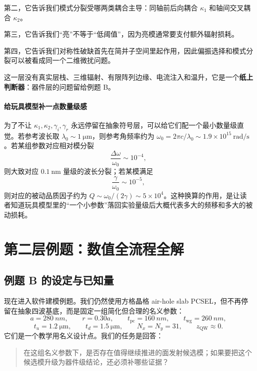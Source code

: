 第二，它告诉我们模式分裂受哪两类耦合主导：同轴前后向耦合 $\kappa_1$ 和轴间交叉耦合 $\kappa_2$。

第三，它告诉我们“亮”不等于“低阈值”，因为亮模通常要支付额外辐射损耗。

第四，它告诉我们对称性破缺首先在简并子空间里起作用，因此偏振选择和模式分裂可以被看成同一个二维微扰问题。

这一层没有真实层栈、三维辐射、有限阵列边缘、电流注入和温升，它是一个\textbf{纸上判断器}：器件层的问题留给例题 B。

\paragraph{给玩具模型补一点数量级感}
为了不让 $\kappa_1,\kappa_2,\gamma_i,\gamma_r$ 永远停留在抽象符号层，可以给它们配一个最小数量级直觉。若参考波长取 $\lambda_0\sim\SI{1}{\micro\meter}$，则参考角频率约为 $\omega_0=2\pi c/\lambda_0\sim 1.9\times10^{15}\ \mathrm{rad/s}$。若某组参数对应相对模分裂
\[
\frac{\Delta\omega}{\omega_0}\sim 10^{-4},
\]
则大致对应 $0.1\ \mathrm{nm}$ 量级的波长分裂；若某模满足
\[
\frac{\gamma}{\omega_0}\sim 10^{-5},
\]
则对应的被动品质因子约为 $Q\sim \omega_0/(2\gamma)\sim 5\times10^4$。这种换算的作用，是让读者知道玩具模型里的“一个小参数”落回实验量级后大概代表多大的频移和多大的被动损耗。

\section{第二层例题：数值全流程全解}
\subsection{例题 B 的设定与已知量}
现在进入软件建模例题。我们仍然使用方格晶格 air-hole slab PCSEL，但不再停留在抽象四波基底，而是固定一组简化但合理的名义参数：
\begin{equation}
a=\SI{280}{nm},
\qquad
r=0.30a,
\qquad
t_{\mathrm{pc}}=\SI{160}{nm},
\qquad
t_{\mathrm{wg}}=\SI{260}{nm},
\label{eq:worked-geom}
\end{equation}
\begin{equation}
t_u=\SI{1.2}{\micro\meter},
\qquad
t_d=\SI{1.5}{\micro\meter},
\qquad
N_x=N_y=31,
\qquad
z_{\mathrm{QW}}\approx 0.
\label{eq:worked-stack}
\end{equation}
它们是一个教学用名义设计点。我们的任务是回答：
\begin{quote}
在这组名义参数下，是否存在值得继续推进的面发射候选模；如果要把这个候选模升级为器件级结论，还必须补哪些证据？
\end{quote}

